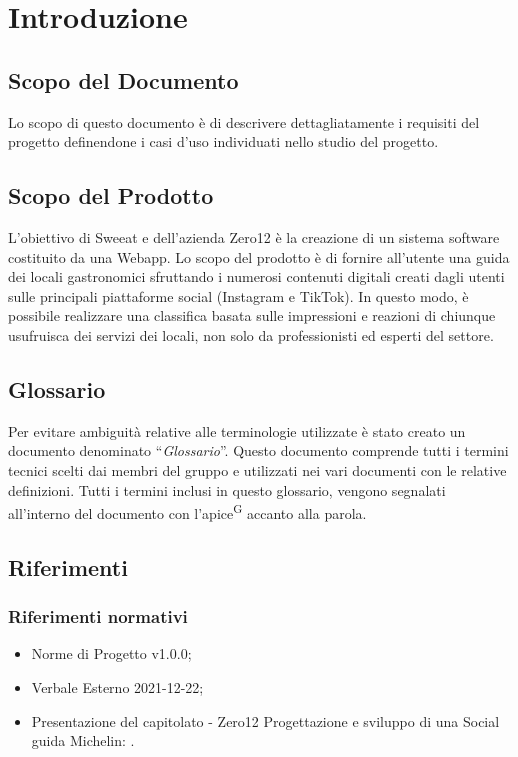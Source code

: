 \section{Introduzione}

\subsection{Scopo del Documento}
Lo scopo di questo documento è di descrivere dettagliatamente i requisiti del progetto definendone i casi d’uso individuati nello studio del progetto.

\subsection{Scopo del Prodotto}

L’obiettivo di Sweeat e dell’azienda Zero12 è la creazione di un sistema software costituito da una Webapp. Lo scopo del prodotto è di fornire all’utente una guida dei locali gastronomici sfruttando i numerosi contenuti digitali creati dagli utenti sulle principali piattaforme social (Instagram e TikTok). In questo modo, è possibile realizzare una classifica basata sulle impressioni e reazioni di chiunque usufruisca dei servizi dei locali, non solo da professionisti ed esperti del settore.

\subsection{Glossario}

Per evitare ambiguità relative alle terminologie utilizzate è stato creato un documento denominato “\textit{Glossario}”. Questo documento comprende tutti i termini tecnici scelti dai membri del gruppo e utilizzati nei vari documenti con le relative definizioni. Tutti i termini inclusi in questo glossario, vengono segnalati all’interno del documento con l’apice\textsuperscript{G} accanto alla parola.

\subsection{Riferimenti}

\subsubsection{Riferimenti normativi}
\begin{itemize}
    \item Norme di Progetto v1.0.0;
    \item Verbale Esterno 2021-12-22;
    \item Presentazione del capitolato - Zero12 Progettazione e sviluppo di una Social guida Michelin: \newline {}.
\end{itemize}
